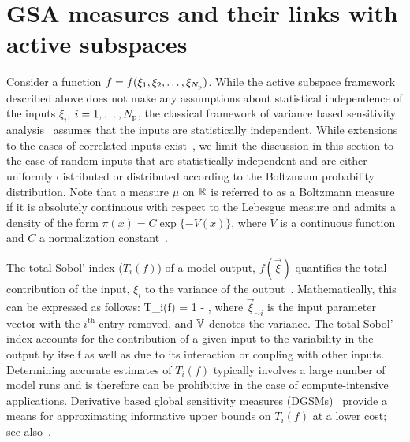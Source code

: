   

\section{GSA measures and their links with active subspaces}
\label{sub:gsa}
Consider a function $f = f(\xi_1, \xi_2, \ldots, \xi_{N_\text{p}})$. 
While the active subspace framework described above does not make any assumptions
about statistical independence of the inputs $\xi_i$, $i = 1, \ldots, {N_\text{p}}$, 
the classical 
framework of variance based sensitivity analysis~\cite{Sobol:2001, Saltelli:2010} 
assumes that the inputs
are statistically independent. While extensions to the cases 
of correlated inputs exist~\cite{Borgonovo:2007,Li:2010,Jacques:2006,Xu:2007,Hart:2017},
 we limit the discussion in this section to the
case of random inputs that are statistically independent and are 
either uniformly distributed or
distributed according to the Boltzmann probability distribution.
Note that a measure $\mu$
on $\mathbb{R}$ is referred to as a Boltzmann measure if it is 
absolutely continuous with respect to the Lebesgue measure  
and admits a density  of the form $\pi(x) = C \exp\{-V(x)\}$,
where $V$ is a continuous function and $C$ a normalization 
constant~\cite{Lamboni:2013}.


The total Sobol' index ($T_i(f)$) of a model output, $f(\vec\xi)$ quantifies
the total contribution of the input, $\xi_i$ to the variance of the
output~\cite{Sobol:2001}. Mathematically, this can be expressed as follows:
%
\be
T_i(f) = 1 - 
,
\label{eq:total}
\ee
%
where $\vec{\xi}_{\sim i}$ is the input parameter vector with the  
$i^\text{th}$ entry removed, and $\mathbb{V}$ denotes the variance. The total Sobol' index accounts
for the contribution of a given input to the variability in the output by itself
as well as due to its interaction or coupling with other inputs. 
Determining accurate estimates of $T_i(f)$ typically involves a large 
number of 
model runs and is therefore can be prohibitive in the case of
compute-intensive applications. Derivative based 
global sensitivity measures (DGSMs)~\cite{Sobol:2009} provide a means for
approximating informative upper bounds on $T_i(f)$ at a lower cost; see 
also~\cite{Vohra:2018}. 

